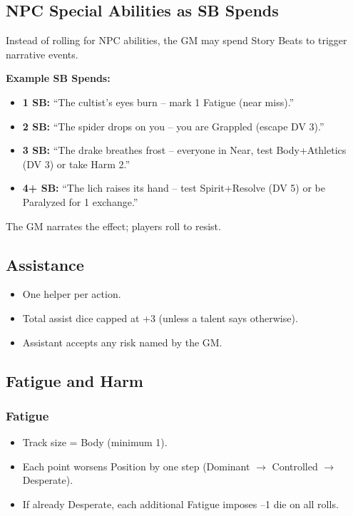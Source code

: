 \subsection{NPC Special Abilities as SB Spends}

Instead of rolling for NPC abilities, the GM may spend Story Beats to trigger narrative events.

\textbf{Example SB Spends:}
\begin{itemize}
  \item \textbf{1 SB:} ``The cultist's eyes burn -- mark 1 Fatigue (near miss).''
  \item \textbf{2 SB:} ``The spider drops on you -- you are Grappled (escape DV 3).''
  \item \textbf{3 SB:} ``The drake breathes frost -- everyone in Near, test Body+Athletics (DV 3) or take Harm 2.''
  \item \textbf{4+ SB:} ``The lich raises its hand -- test Spirit+Resolve (DV 5) or be Paralyzed for 1 exchange.''
\end{itemize}
The GM narrates the effect; players roll to resist.

\subsection{Assistance}

\begin{itemize}
  \item One helper per action.
  \item Total assist dice capped at +3 (unless a talent says otherwise).
  \item Assistant accepts any risk named by the GM.
\end{itemize}

\subsection{Fatigue and Harm}

\subsubsection{Fatigue}
\begin{itemize}
  \item Track size = Body (minimum 1).
  \item Each point worsens Position by one step (Dominant $\rightarrow$ Controlled $\rightarrow$ Desperate).
  \item If already Desperate, each additional Fatigue imposes --1 die on all rolls.
\end{itemize}


